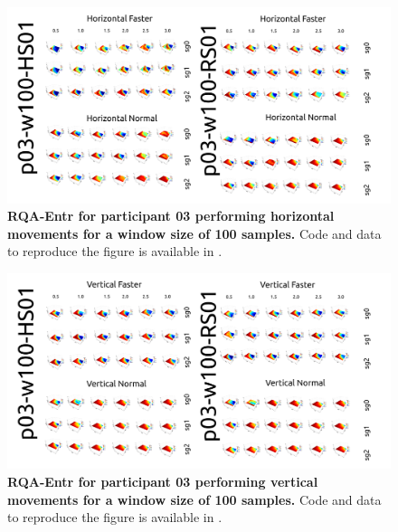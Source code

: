 \documentclass[12pt]{article}
\begin{document}
\newpage
\begin{figure}[ht!]
\centering
\includegraphics[scale=1.0]{figures/rqa/output/epsilons/rqa-epsilonsp03w100Horizontal}
    	\caption{
	{\bf RQA-Entr for participant 03 performing horizontal movements for a window size of 100 samples.}
	Code and data to reproduce the figure is available in \cite{srep2021}.
        }
    \label{fig-p03-H-w100}
\end{figure}
\begin{figure}[hb!]
\centering
\includegraphics[scale=1.0]{figures/rqa/output/epsilons/rqa-epsilonsp03w100Vertical}
    	\caption{
	{\bf RQA-Entr for participant 03 performing vertical movements for a window size of 100 samples.}
	Code and data to reproduce the figure is available in \cite{srep2021}.
        }
    \label{fig-p03-V-w100}
\end{figure}
\end{document}
